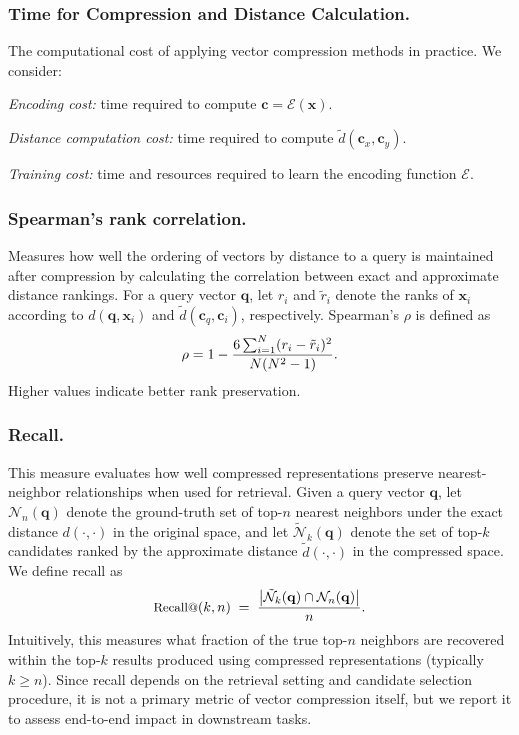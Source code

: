 \documentclass[sigconf]{acmart}
\begin{document}
\subsubsection{Time for Compression and Distance Calculation.}
The computational cost of applying vector compression methods in practice.
We consider: 

\emph{Encoding cost:} time required to compute $\mathbf{c}=\mathcal{E}(\mathbf{x})$.

\emph{Distance computation cost:} time required to compute $\tilde{d}(\mathbf{c}_x, \mathbf{c}_y)$.

\emph{Training cost:} time and resources required to learn the encoding function 
$\mathcal{E}$.

\subsubsection{Spearman's rank correlation.} Measures how well the ordering of vectors by distance to a query is maintained after compression by calculating the correlation between exact and approximate distance rankings. 
For a query vector $\mathbf{q}$, let $r_i$ and $\tilde{r}_i$ denote the ranks of $\mathbf{x}_i$ according to $d(\mathbf{q}, \mathbf{x}_i)$ and $\tilde{d}(\mathbf{c}_q, \mathbf{c}_i)$, respectively. Spearman's $\rho$ is  defined as 
\[\small
\rho = 1 - \frac{6 \sum_{i=1}^N (r_i - \tilde{r}_i)^2}{N(N^2 - 1)}.
\]
Higher values indicate better rank preservation.

\subsubsection{Recall.}
This measure evaluates how well compressed representations preserve nearest-neighbor relationships when used for retrieval. 
Given a query vector $\mathbf{q}$, let $\mathcal{N}_n(\mathbf{q})$ denote the ground-truth set of top-$n$ nearest neighbors under the exact distance $d(\cdot,\cdot)$ in the original space, and let $\tilde{\mathcal{N}}_k(\mathbf{q})$ denote the set of top-$k$ candidates ranked by the approximate distance $\tilde{d}(\cdot,\cdot)$ in the compressed space. 
We define recall as
\[\small
\text{Recall@}(k,n) \;=\;
\frac{\left| \tilde{\mathcal{N}}_k(\mathbf{q}) \cap \mathcal{N}_n(\mathbf{q}) \right|}{n}.
\]
Intuitively, this measures what fraction of the true top-$n$ neighbors are recovered within the top-$k$ results produced using compressed representations (typically $k \ge n$). 
Since recall depends on the retrieval setting and candidate selection procedure, it is not a primary metric of vector compression itself, but we report it to assess end-to-end impact in downstream tasks.
\end{document}
